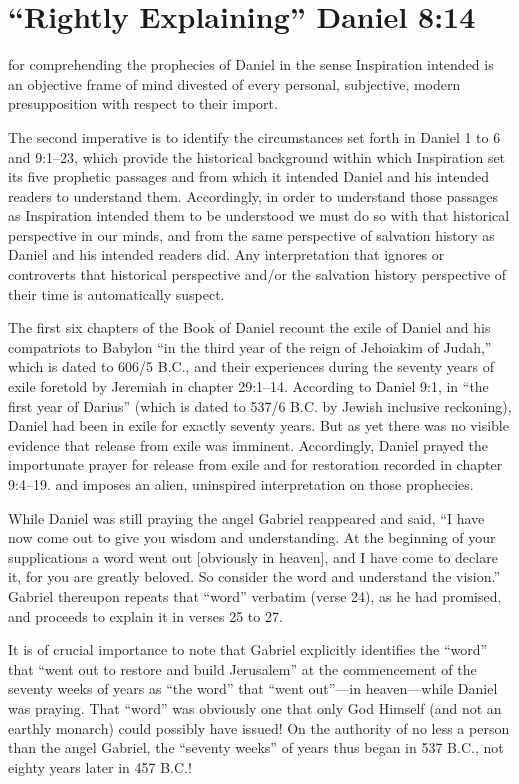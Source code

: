 \chapter{``Rightly Explaining'' Daniel 8:14}
\label{ch:explain}

 for comprehending the prophecies of Daniel in the sense
Inspiration intended is an objective frame of mind divested of every
personal, subjective, modern presupposition with respect to their import.

The second imperative is to identify the circumstances set forth in Daniel 1
to 6 and 9:1--23, which provide the historical background within which
Inspiration set its five prophetic passages and from which it intended
Daniel and his intended readers to understand them. Accordingly, in order to
understand those passages as Inspiration intended them to be understood we
must do so with that historical perspective in our minds, and from the same
perspective of salvation history as Daniel and his intended readers did. Any
interpretation that ignores or controverts that historical perspective and/or 
the salvation history perspective of their time is automatically suspect.

The first six chapters of the Book of Daniel recount the exile of Daniel and
his compatriots to Babylon ``in the third year of the reign of Jehoiakim of
Judah,'' which is dated to 606/5 B.C., and their experiences during the
seventy years of exile foretold by Jeremiah in chapter 29:1--14. According to
Daniel 9:1, in ``the first year of Darius'' (which is dated to 537/6 B.C. by
Jewish inclusive reckoning), Daniel had been in exile for exactly seventy
years. But as yet there was no visible evidence that release from exile was
imminent. Accordingly, Daniel prayed the importunate prayer for release from
exile and for restoration recorded in chapter 9:4--19. 
and imposes an alien, uninspired interpretation on those prophecies. 

While Daniel was still praying the angel Gabriel 
reappeared and said, ``I
have now come out to give you wisdom and understanding. At the beginning of
your supplications a word went out [obviously in heaven], and I have come to
declare it, for you are greatly beloved. So consider the word and understand
the vision.'' Gabriel thereupon repeats that ``word'' verbatim (verse 24), as
he had promised, and proceeds to explain it in verses 25 to 27. 

It is of crucial importance to note that Gabriel explicitly identifies the
``word'' that ``went out to restore and build Jerusalem'' at the commencement of
the seventy weeks of years as ``the word'' that ``went out''---in heaven---while
Daniel was praying. That 
``word'' was obviously one that only God Himself 
(and not an earthly monarch) could possibly have issued! On the authority of
no less a person than the angel Gabriel, the ``seventy weeks'' of years thus
began in 537 B.C., not eighty years later in 457 B.C.!

